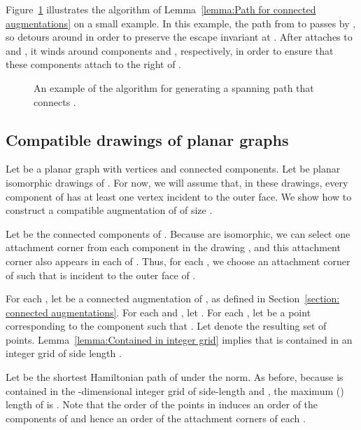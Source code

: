 \documentclass[11pt]{patmorin}
\begin{document}
Figure~\ref{figure:big-example} illustrates the algorithm of Lemma~\ref{lemma:Path for connected augmentations} on a small example.  In this example, the path from  to  passes by , so  detours around  in order to preserve the escape invariant at .  After  attaches to  and , it winds around components  and , respectively, in order to ensure that these components attach to the right of .

\begin{figure}
   \caption{An example of the algorithm for generating a spanning path that connects .}
   \label{figure:big-example}
\end{figure}

\subsection{Compatible drawings of planar graphs}
Let  be a planar graph with  vertices and  connected
components.  Let  be  planar isomorphic drawings
of .  For now, we will assume that, in these drawings,
every component of  has at least one vertex incident to
the outer face.  
We show how to construct a compatible augmentation of 
of size .

Let  be the connected components of .  Because  are isomorphic, we can select one attachment corner from each component in the drawing , and this attachment corner also appears in each of . Thus, for each , we choose an attachment corner  of  such that  is incident to the outer face of .

For each , let  be a connected augmentation of , as defined in Section~\ref{section: connected augmentations}. For each  and , let . For each , let  be a point corresponding to the component  such that . Let  denote the resulting set of points. Lemma~\ref{lemma:Contained in integer grid} implies that  is contained in an integer grid of side length .

Let  be the shortest Hamiltonian path of  under the  norm. As before, because  is contained in the -dimensional integer grid of side-length  and , the maximum () length of  is . Note that the order of the points in  induces an order of the components of  and hence an order of the attachment corners of each .
\end{document}
